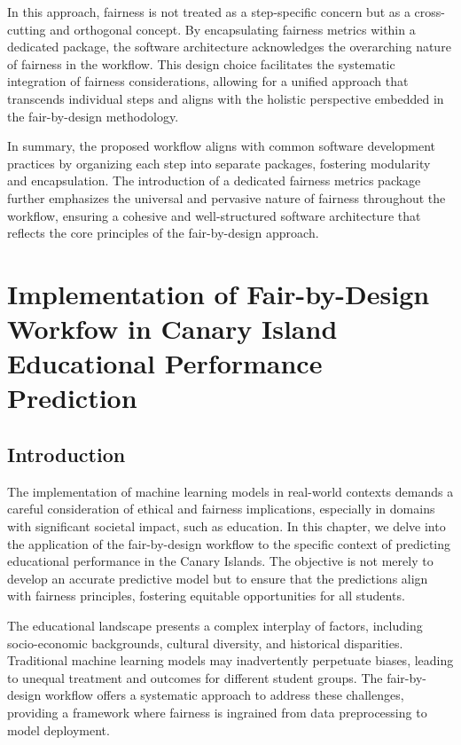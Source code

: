 In this approach, fairness is not treated as a step-specific concern but as a cross-cutting and orthogonal concept. By encapsulating fairness metrics within a dedicated package, the software architecture acknowledges the overarching nature of fairness in the workflow. This design choice facilitates the systematic integration of fairness considerations, allowing for a unified approach that transcends individual steps and aligns with the holistic perspective embedded in the fair-by-design methodology.

In summary, the proposed workflow aligns with common software development practices by organizing each step into separate packages, fostering modularity and encapsulation. The introduction of a dedicated fairness metrics package further emphasizes the universal and pervasive nature of fairness throughout the workflow, ensuring a cohesive and well-structured software architecture that reflects the core principles of the fair-by-design approach.

\chapter{Implementation of Fair-by-Design Workfow in Canary Island Educational Performance Prediction}
\label{chap:real-world-scenario}

\section{Introduction}

The implementation of machine learning models in real-world contexts demands a careful consideration of ethical and fairness implications, especially in domains with significant societal impact, such as education. In this chapter, we delve into the application of the fair-by-design workflow to the specific context of predicting educational performance in the Canary Islands. The objective is not merely to develop an accurate predictive model but to ensure that the predictions align with fairness principles, fostering equitable opportunities for all students.

The educational landscape presents a complex interplay of factors, including socio-economic backgrounds, cultural diversity, and historical disparities. Traditional machine learning models may inadvertently perpetuate biases, leading to unequal treatment and outcomes for different student groups. The fair-by-design workflow offers a systematic approach to address these challenges, providing a framework where fairness is ingrained from data preprocessing to model deployment.

